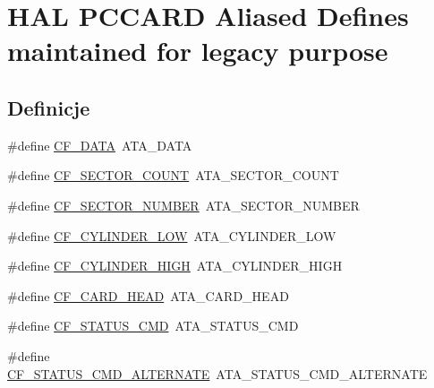 \hypertarget{group___h_a_l___p_c_c_a_r_d___aliased___defines}{}\section{H\+AL P\+C\+C\+A\+RD Aliased Defines maintained for legacy purpose}
\label{group___h_a_l___p_c_c_a_r_d___aliased___defines}
\subsection*{Definicje}
\begin{DoxyCompactItemize}
\item 
\#define \hyperlink{group___h_a_l___p_c_c_a_r_d___aliased___defines_ga1e379206d5b5ca5c74846be8101d7b2f}{C\+F\+\_\+\+D\+A\+TA}~A\+T\+A\+\_\+\+D\+A\+TA
\item 
\#define \hyperlink{group___h_a_l___p_c_c_a_r_d___aliased___defines_gaf937a59264a458c704f4707793810f57}{C\+F\+\_\+\+S\+E\+C\+T\+O\+R\+\_\+\+C\+O\+U\+NT}~A\+T\+A\+\_\+\+S\+E\+C\+T\+O\+R\+\_\+\+C\+O\+U\+NT
\item 
\#define \hyperlink{group___h_a_l___p_c_c_a_r_d___aliased___defines_ga7389836c216283b17320cfe74f8f12fa}{C\+F\+\_\+\+S\+E\+C\+T\+O\+R\+\_\+\+N\+U\+M\+B\+ER}~A\+T\+A\+\_\+\+S\+E\+C\+T\+O\+R\+\_\+\+N\+U\+M\+B\+ER
\item 
\#define \hyperlink{group___h_a_l___p_c_c_a_r_d___aliased___defines_gad632388e8f6b11fcb0f25eff8d507e20}{C\+F\+\_\+\+C\+Y\+L\+I\+N\+D\+E\+R\+\_\+\+L\+OW}~A\+T\+A\+\_\+\+C\+Y\+L\+I\+N\+D\+E\+R\+\_\+\+L\+OW
\item 
\#define \hyperlink{group___h_a_l___p_c_c_a_r_d___aliased___defines_ga43bb6343f981ac88b0b5598c72bccd83}{C\+F\+\_\+\+C\+Y\+L\+I\+N\+D\+E\+R\+\_\+\+H\+I\+GH}~A\+T\+A\+\_\+\+C\+Y\+L\+I\+N\+D\+E\+R\+\_\+\+H\+I\+GH
\item 
\#define \hyperlink{group___h_a_l___p_c_c_a_r_d___aliased___defines_gaceaabc796a845eb796bb2cc345f4bd04}{C\+F\+\_\+\+C\+A\+R\+D\+\_\+\+H\+E\+AD}~A\+T\+A\+\_\+\+C\+A\+R\+D\+\_\+\+H\+E\+AD
\item 
\#define \hyperlink{group___h_a_l___p_c_c_a_r_d___aliased___defines_ga389faeb4c87e15bd7a5534b8b983d973}{C\+F\+\_\+\+S\+T\+A\+T\+U\+S\+\_\+\+C\+MD}~A\+T\+A\+\_\+\+S\+T\+A\+T\+U\+S\+\_\+\+C\+MD
\item 
\#define \hyperlink{group___h_a_l___p_c_c_a_r_d___aliased___defines_ga08ffd51015a7ea6cd10e15e664e9870e}{C\+F\+\_\+\+S\+T\+A\+T\+U\+S\+\_\+\+C\+M\+D\+\_\+\+A\+L\+T\+E\+R\+N\+A\+TE}~A\+T\+A\+\_\+\+S\+T\+A\+T\+U\+S\+\_\+\+C\+M\+D\+\_\+\+A\+L\+T\+E\+R\+N\+A\+TE

\end{DoxyCompactItemize}
